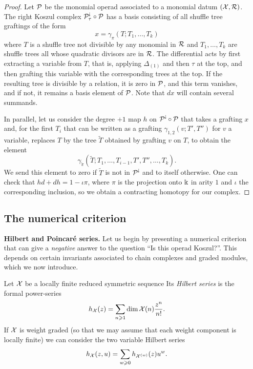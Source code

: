 \begin{proof}
Let ${\mathcal{P}}$ be the monomial operad associated to a monomial datum $(\mathcal{X},\mathcal{R})$.
The right Koszul complex $\PP^\antishriek_\tau\circ\PP$ has a basis consisting
of all shuffle tree graftings of the form
\[ x = \gamma_{\pi}(T; T_1,\ldots,T_k) 
\]
where $T$ is a shuffle tree not divisible by any monomial in $\mathcal{R}$ and
$T_1,\ldots,T_k$ are shuffle trees all whose quadratic divisors are in $\mathcal{R}$.
The differential acts by first extracting a variable from $T$, that is,
applying $\Delta_{(1)}$ and then $\tau$ at the top, and then grafting this
variable with the corresponding trees at the top. If the resulting tree 
is divisible by a relation, it is zero in ${\mathcal{P}}$, and this term vanishes,
and if not, it remains a basis element of ${\mathcal{P}}$. Note that $dx$ will 
contain several summands. 

In parallel, let us consider the degree $+1$ map $h$ on $\PP^\antishriek\circ\PP$
that takes a grafting $x$ and, for the first $T_i$ that can be written as a
grafting $\gamma_{1,2}(v ; T',T'')$ for $v$ a variable, replaces
$T$ by the tree $\tilde{T}$ obtained by grafting $v$ on $T$, to obtain the element
\[
\gamma_{\tilde{\pi}}(\tilde{T}; T_1,\ldots,T_{i-1},T',T'',\ldots,T_k).
\]
We send this element to zero if $\tilde{T}$ is not in $\PP^\antishriek$
and to itself otherwise. One can check that $hd + dh = 1-\iota\pi$, 
where $\pi$ is the projection onto $\Bbbk$ in arity $1$ and $\iota$ the 
corresponding inclusion, so we obtain a contracting homotopy for our complex.
\end{proof}
\subsection{The numerical criterion}

\textbf{Hilbert and Poincar\'e series.} Let us begin
by presenting a numerical criterion that can give a \emph{negative}
answer to the question ``Is this operad Koszul?''. This
depends on certain invariants associated to chain complexes
and graded modules, which we now introduce.

\begin{definition}
Let $\mathcal{X}$ be a locally finite reduced symmetric sequence
Its \emph{Hilbert series} is the formal power-series
\[
h_{\mathcal{X}}(z) = \sum_{n\geqslant 1} \dim \mathcal{X}(n) \frac{z^n}{n!}.
\]
If $\mathcal{X}$ is weight graded (so that we may assume that each
weight component is locally finite) we can consider the two
variable Hilbert series
 \[
h_{\mathcal{X}}(z,u) = \sum_{w\geqslant 0} h_{\mathcal{X}^{(w)}}(z) u^w.
\]
\end{definition}

